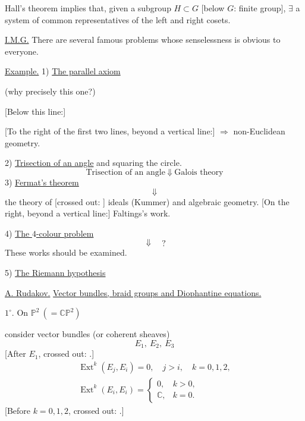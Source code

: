 Hall's theorem implies that, given a subgroup $H\subset G$
[below $G$: finite group],
$\exists$ a system of common representatives of the left and right cosets.

\underline{I.M.G.} There are several famous problems whose senselessness
is obvious to everyone.

\underline{Example.} 1) \underline{The parallel axiom}

(why precisely this one?)

[Below this line:]

[To the right of the first two lines, beyond a vertical line:]
$\Rightarrow$ non-Euclidean geometry.

2) \underline{Trisection of an angle} and squaring the circle.
\begin{equation*}
\text{Trisection of an angle}\ \Downarrow\ \text{Galois theory}
\end{equation*}
3) \underline{Fermat's theorem}
\begin{equation*}
\Downarrow
\end{equation*}
the theory of [crossed out:
]
ideals (Kummer) and algebraic geometry.
[On the right, beyond a vertical line:] Faltings's work.

4) \underline{The $4$-colour problem}
\begin{equation*}
\Downarrow\quad ?
\end{equation*}
These works should be examined.

5) \underline{The Riemann hypothesis}

\underline{A. Rudakov.}\quad
\underline{Vector bundles, braid groups and Diophantine equations.}

$1^{\circ}$. On $\mathbb{P}^{2}\ (= \mathbb{C}\mathbb{P}^{2})$

consider vector bundles (or coherent sheaves)
\begin{equation*}
E_1,\ E_2,\ E_3 \tag{1}
\end{equation*}
[After $E_1$, crossed out:
.]
\begin{equation*}
\begin{gathered}
\operatorname{Ext}^{k}(E_j,E_i)=0,\quad j>i,\quad k=0,1,2,\\
\operatorname{Ext}^{k}(E_i,E_i)=
\begin{cases}
0,& k>0,\\
\mathbb{C},& k=0.
\end{cases}
\end{gathered}
\tag{2}
\end{equation*}
[Before $k=0,1,2$, crossed out:
.]

